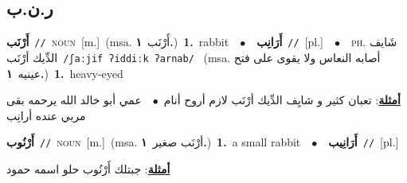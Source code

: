 \documentclass[10pt,a4paper,twoside]{article} %
\begin{document}
\begin{multicols}{2}
\vspace{-3mm}
\subsection*{\color{blue}\foreignlanguage{arabic}{ر.ن.ب}\color{blue}{}} 

{\setlength\topsep{0pt}\textbf{\foreignlanguage{arabic}{أَرْنَب}}\ {\color{gray}\texttt{//}\color{black}}\ \textsc{noun}\ [m.]\ \color{gray}(msa. \foreignlanguage{arabic}{أَرْنَب}~\foreignlanguage{arabic}{\textbf{١.}})\color{black}\ \textbf{1.}~rabbit\ \ $\bullet$\ \ \setlength\topsep{0pt}\textbf{\foreignlanguage{arabic}{أَرَانِب}}\ {\color{gray}\texttt{//}\color{black}}\ [pl.]\ \ $\bullet$\ \ \textsc{ph.} \color{gray} \foreignlanguage{arabic}{شَايف الدِّيك أرْنَب}\color{black}\ {\color{gray}\texttt{/{\sffamily ʃaːjif ʔiddiːk ʔarnab}/}\color{black}}\ \color{gray} (msa. \foreignlanguage{arabic}{أصابه النعاس ولا يقوى على فتح عينيه}~\foreignlanguage{arabic}{\textbf{١.}})\color{black}\ \textbf{1.}~heavy-eyed\  \begin{flushright}\color{gray}\foreignlanguage{arabic}{\textbf{\underline{\foreignlanguage{arabic}{أمثلة}}}: تعبان كثير و شايِف الدِّيك أرْنَب لازم أروح أنام\ $\bullet$\ \  عمي أبو خالد الله يرحمه بقى مربي عنده أرانِب}\end{flushright}\color{black}} \vspace{2mm}

{\setlength\topsep{0pt}\textbf{\foreignlanguage{arabic}{أَرْنُوب}}\ {\color{gray}\texttt{//}\color{black}}\ \textsc{noun}\ [m.]\ \color{gray}(msa. \foreignlanguage{arabic}{أرْنَب صغير}~\foreignlanguage{arabic}{\textbf{١.}})\color{black}\ \textbf{1.}~a small rabbit\ \ $\bullet$\ \ \setlength\topsep{0pt}\textbf{\foreignlanguage{arabic}{أَرَانِيب}}\ {\color{gray}\texttt{//}\color{black}}\ [pl.]\  \begin{flushright}\color{gray}\foreignlanguage{arabic}{\textbf{\underline{\foreignlanguage{arabic}{أمثلة}}}: جبتلك أَرْنُوب حلو اسمه حمود}\end{flushright}\color{black}} \vspace{2mm}


\end{multicols}
\end{document}
